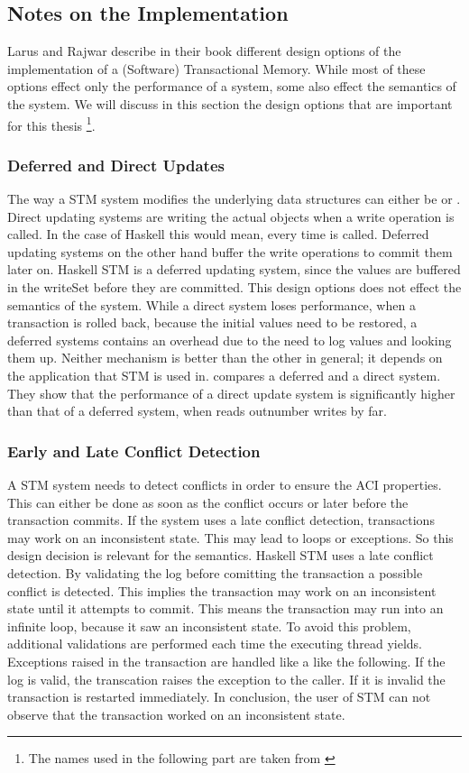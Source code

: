 \subsection{Notes on the Implementation}
Larus and Rajwar describe in their book\parencite[Chapter 2]{transBook} different design options of the implementation of a 
(Software) Transactional Memory. While most of these options effect only the performance of a system, some also effect the 
semantics of the system. We will discuss in this section the design options that are important for this thesis \footnote{The names used in the 
following part are taken from \parencite[Chapter 2]{transBook}}.

\subsubsection{Deferred and Direct Updates} The way a STM system modifies the underlying data structures can either be 
or . Direct updating systems are writing the actual objects when a write operation is called. In the case of Haskell 
this would mean, every time  is called. Deferred updating systems on the other hand buffer the write operations to
commit them later on. Haskell STM is a deferred updating system, since the values are buffered in the writeSet before they are
committed. This design options does not effect the semantics of the system. While a direct system loses performance, when a transaction
is rolled back, because the initial values need to be restored, a deferred systems contains an overhead due to the need to log values
and looking them up. Neither mechanism is better than the other in general; it depends on the application that STM is used in. 
\parencite{pessimisticSTM} compares a deferred and a direct system. They show that the performance of a direct update 
system is significantly higher than that of a deferred system, when reads outnumber writes by far.

\subsubsection{Early and Late Conflict Detection} A STM system needs to detect conflicts in order to ensure the ACI properties. This can 
either be done as soon as the conflict occurs or later before the transaction commits. If the system uses a late conflict 
detection, transactions may work on an inconsistent state. This may lead to loops or exceptions. So this design decision is 
relevant for the semantics. Haskell STM uses a late conflict detection. By validating the log before comitting the transaction a possible conflict
is detected. This implies the transaction may work on an inconsistent state until it attempts to commit. This means the transaction 
may run into an infinite loop, because it saw an inconsistent state. To avoid this problem, additional validations are performed
each time the executing thread yields. Exceptions raised in the transaction are handled like a like the following. If the log is valid,
the transcation raises the exception to the caller. If it is invalid the transaction is restarted immediately.
In conclusion, the user of STM can not observe that the transaction worked on an inconsistent state.

